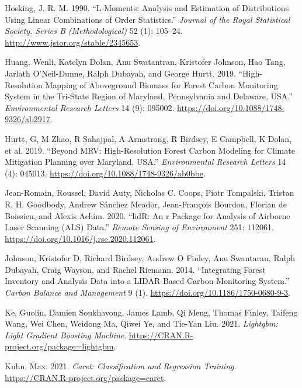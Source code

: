 \documentclass[]{elsarticle} %
\newlength{\cslhangindent}
\newenvironment{CSLReferences}[2] %
 {%
  \setlength{\parindent}{0pt}
  \ifodd #1 \everypar{\setlength{\hangindent}{\cslhangindent}}\ignorespaces\fi
  \ifnum #2 > 0
  \setlength{\parskip}{#2\baselineskip}
  \fi
 }%
 {}
\begin{document}
\begin{CSLReferences}{1}{0}
\leavevmode{}%
Hosking, J. R. M. 1990. {``L-Moments: Analysis and Estimation of Distributions Using Linear Combinations of Order Statistics.''} \emph{Journal of the Royal Statistical Society. Series B (Methodological)} 52 (1): 105--24. \url{http://www.jstor.org/stable/2345653}.

\leavevmode{}%
Huang, Wenli, Katelyn Dolan, Anu Swatantran, Kristofer Johnson, Hao Tang, Jarlath O'Neil-Dunne, Ralph Dubayah, and George Hurtt. 2019. {``High-Resolution Mapping of Aboveground Biomass for Forest Carbon Monitoring System in the Tri-State Region of Maryland, Pennsylvania and Delaware, {USA}.''} \emph{Environmental Research Letters} 14 (9): 095002. \url{https://doi.org/10.1088/1748-9326/ab2917}.

\leavevmode{}%
Hurtt, G, M Zhao, R Sahajpal, A Armstrong, R Birdsey, E Campbell, K Dolan, et al. 2019. {``Beyond {MRV}: High-Resolution Forest Carbon Modeling for Climate Mitigation Planning over Maryland, {USA}.''} \emph{Environmental Research Letters} 14 (4): 045013. \url{https://doi.org/10.1088/1748-9326/ab0bbe}.

\leavevmode{}%
Jean-Romain, Roussel, David Auty, Nicholas C. Coops, Piotr Tompalski, Tristan R. H. Goodbody, Andrew Sánchez Meador, Jean-François Bourdon, Florian de Boissieu, and Alexis Achim. 2020. {``lidR: An r Package for Analysis of Airborne Laser Scanning (ALS) Data.''} \emph{Remote Sensing of Environment} 251: 112061. \url{https://doi.org/10.1016/j.rse.2020.112061}.

\leavevmode{}%
Johnson, Kristofer D, Richard Birdsey, Andrew O Finley, Anu Swantaran, Ralph Dubayah, Craig Wayson, and Rachel Riemann. 2014. {``Integrating Forest Inventory and Analysis Data into a {LIDAR}-Based Carbon Monitoring System.''} \emph{Carbon Balance and Management} 9 (1). \url{https://doi.org/10.1186/1750-0680-9-3}.

\leavevmode{}%
Ke, Guolin, Damien Soukhavong, James Lamb, Qi Meng, Thomas Finley, Taifeng Wang, Wei Chen, Weidong Ma, Qiwei Ye, and Tie-Yan Liu. 2021. \emph{Lightgbm: Light Gradient Boosting Machine}. \url{https://CRAN.R-project.org/package=lightgbm}.

\leavevmode{}%
Kuhn, Max. 2021. \emph{Caret: Classification and Regression Training}. \url{https://CRAN.R-project.org/package=caret}.


\end{CSLReferences}
\end{document}
